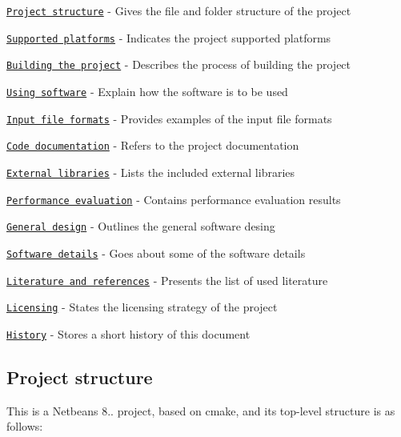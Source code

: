\begin{DoxyEnumerate}
\item \href{#project-structure}{\tt Project structure} -\/ Gives the file and folder structure of the project
\item \href{#supported-platforms}{\tt Supported platforms} -\/ Indicates the project supported platforms
\item \href{#building-the-project}{\tt Building the project} -\/ Describes the process of building the project
\item \href{#using-software}{\tt Using software} -\/ Explain how the software is to be used
\item \href{#input-file-formats}{\tt Input file formats} -\/ Provides examples of the input file formats
\item \href{#code-documentation}{\tt Code documentation} -\/ Refers to the project documentation
\item \href{#external-libraries}{\tt External libraries} -\/ Lists the included external libraries
\item \href{#performance-evaluation}{\tt Performance evaluation} -\/ Contains performance evaluation results
\item \href{#general-design}{\tt General design} -\/ Outlines the general software desing
\item \href{#software-details}{\tt Software details} -\/ Goes about some of the software details
\item \href{#literature-and-references}{\tt Literature and references} -\/ Presents the list of used literature
\item \href{#licensing}{\tt Licensing} -\/ States the licensing strategy of the project
\item \href{#history}{\tt History} -\/ Stores a short history of this document
\end{DoxyEnumerate}

\subsection*{Project structure}

This is a Netbeans 8.. project, based on cmake, and its top-\/level structure is as follows\+:


